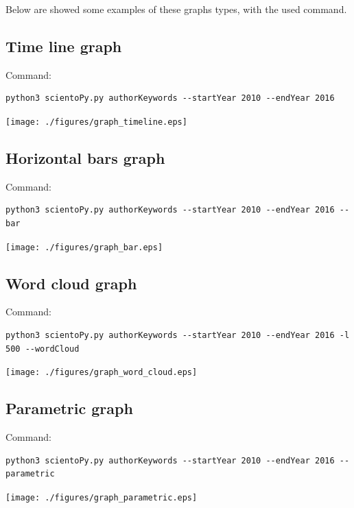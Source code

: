 \documentclass[10pt,letterpaper]{article}
\begin{document}
Below are showed some examples of these graphs types, with the used command.

\subsection{Time line graph}
Command: 
\begin{verbatim}
python3 scientoPy.py authorKeywords --startYear 2010 --endYear 2016
\end{verbatim}

\begin{center}
	\texttt{[image: ./figures/graph\_timeline.eps]}
\end{center}


\subsection{Horizontal bars graph}
Command: 
\begin{verbatim}
python3 scientoPy.py authorKeywords --startYear 2010 --endYear 2016 --bar
\end{verbatim}

\begin{center}
	\texttt{[image: ./figures/graph\_bar.eps]}
\end{center}


\subsection{Word cloud graph}
Command: 
\begin{verbatim}
python3 scientoPy.py authorKeywords --startYear 2010 --endYear 2016 -l 500 --wordCloud
\end{verbatim}

\begin{center}
	\texttt{[image: ./figures/graph\_word\_cloud.eps]}
\end{center}

\newpage
\subsection{Parametric graph}
Command: 
\begin{verbatim}
python3 scientoPy.py authorKeywords --startYear 2010 --endYear 2016 --parametric
\end{verbatim}

\begin{center}
	\texttt{[image: ./figures/graph\_parametric.eps]}
\end{center}
\end{document}

